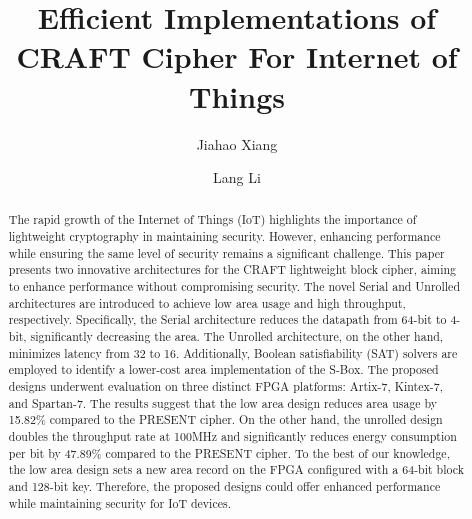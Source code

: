 \documentclass[final,5p,times,twocolumn]{elsarticle}
\begin{document}
\begin{frontmatter}

    \title{Efficient Implementations of CRAFT Cipher For Internet of Things }

    \author[]{Jiahao Xiang}
    \author[]{Lang Li}







    \begin{abstract}
        The rapid growth of the Internet of Things (IoT) highlights the importance of lightweight cryptography in maintaining security.
        However, enhancing performance while ensuring the same level of security remains a significant challenge.
        This paper presents two innovative architectures for the CRAFT lightweight block cipher, aiming to enhance performance without compromising security.
        The novel Serial and Unrolled architectures are introduced to achieve low area usage and high throughput, respectively.
        Specifically, the Serial architecture reduces the datapath from 64-bit to 4-bit, significantly decreasing the area.
        The Unrolled architecture, on the other hand, minimizes latency from 32 to 16.
        Additionally, Boolean satisfiability (SAT) solvers are employed to identify a lower-cost area implementation of the S-Box.
        The proposed designs underwent evaluation on three distinct FPGA platforms: Artix-7, Kintex-7, and Spartan-7.
        The results suggest that the low area design reduces area usage by 15.82\% compared to the PRESENT cipher.
        On the other hand, the unrolled design doubles the throughput rate at 100MHz and significantly reduces energy consumption per bit by 47.89\% compared to the PRESENT cipher.
        To the best of our knowledge, the low area design sets a new area record on the FPGA configured with a 64-bit block and 128-bit key.
        Therefore, the proposed designs could offer enhanced performance while maintaining security for IoT devices.
    \end{abstract}



\end{frontmatter}
\end{document}

